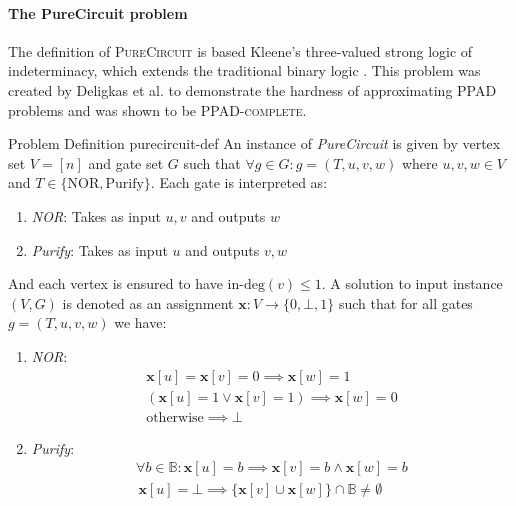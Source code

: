 \paragraph{The PureCircuit problem}
\label{par:pure-circ-def}

The definition of \textsc{PureCircuit} is based Kleene's three-valued strong logic of indeterminacy,
which extends the traditional binary logic \cite{kleene_IntroductionMetamathematics_2009}.
This problem was created by Deligkas et al. \cite{deligkas_PureCircuitTightInapproximability_2024}
to demonstrate the hardness of approximating \textsc{PPAD} problems and was shown to be \textsc{PPAD-complete}.


\begin{definitionbox}{ Problem Definition \cite{deligkas_PureCircuitTightInapproximability_2024}}{purecircuit-def}
    An instance of \textit{PureCircuit} is given by vertex set $V= [n]$ and gate set $G$ such that
    $\forall g \in G: g=(T,u,v,w)$ where $u,v,w \in V$ and $T \in \{\text{NOR}, \text{Purify}\}$.
    Each gate is interpreted as:
    \begin{enumerate}
        \item \textit{NOR}: Takes as input $u,v$ and outputs $w$
        \item \textit{Purify}: Takes as input $u$ and outputs $v,w$
    \end{enumerate}
    And each vertex is ensured to have $\text{in-deg}(v) \leq 1$.
    A solution to input instance $(V,G)$ is denoted as an assignment $\mathbf{x} : V \to \{0, \bot, 1\}$
    such that for all gates $g = (T,u,v,w)$ we have:
    \begin{enumerate}
        \item \textit{NOR}:
              \begin{gather*}
                  \mathbf{x}[u] = \mathbf{x}[v] = 0 \implies \mathbf{x}[w] = 1\\
                  (\mathbf{x}[u] =1 \vee \mathbf{x}[v] =1) \implies \mathbf{x}[w] = 0 \\
                  \text{otherwise} \implies \bot
              \end{gather*}

        \item \textit{Purify}:
              \begin{gather*}
                  \forall b \in \mathbb{B}: \mathbf{x}[u] = b \implies \mathbf{x}[v] = b \wedge \mathbf{x}[w] =  b\\
                  \, \mathbf{x}[u] = \bot \implies \{\mathbf{x}[v] \cup \mathbf{x}[w] \} \cap \mathbb{B}\neq \emptyset
                  \, \, \end{gather*}
    \end{enumerate}
\end{definitionbox}

